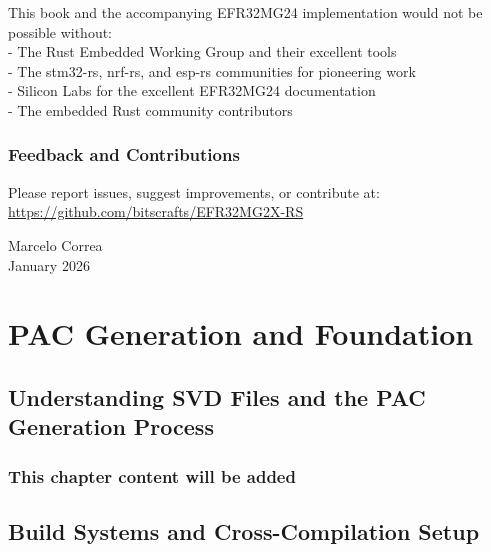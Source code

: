 \documentclass[11pt,a4paper,twoside,openright]{book}
\begin{document}
This book and the accompanying EFR32MG24 implementation would not be possible without:
\\- The Rust Embedded Working Group and their excellent tools
\\- The stm32-rs, nrf-rs, and esp-rs communities for pioneering work
\\- Silicon Labs for the excellent EFR32MG24 documentation
\\- The embedded Rust community contributors

\section*{Feedback and Contributions}

Please report issues, suggest improvements, or contribute at:
\\\url{https://github.com/bitscrafts/EFR32MG2X-RS}

\vspace*{2em}
\begin{flushright}
Marcelo Correa\\
January 2026
\end{flushright}

\clearpage

\mainmatter

\part{PAC Generation and Foundation}
\label{part:pac-foundation}



\chapter{Understanding SVD Files and the PAC Generation Process}
\label{ch:chapter-02}
\section*{This chapter content will be added}
\clearpage

\chapter{Build Systems and Cross-Compilation Setup}
\label{ch:chapter-03}
\end{document}
